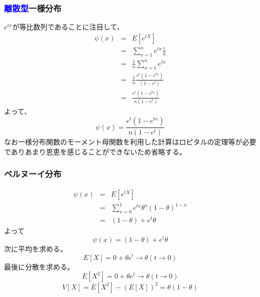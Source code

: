 \documentclass[a4paper,10pt]{jarticle}
\begin{document}
\subsubsection{\textcolor{blue}{離散型}一様分布}
$e^{tx}$が等比数列であることに注目して、
\begin{eqnarray*}
    \psi(x) &=& E[e^{tX}] \\
    &=& \sum_{x=1}^n e^{tx}\frac{1}{n}\\
    &=& \frac{1}{n}\sum_{x=1}^n e^{tx}\\
    &=& \frac{1}{n}\frac{e^t(1-e^{tn})}{(1-e^t)}\\
    &=& \frac{e^t(1-e^{tn})}{n(1-e^t)}
\end{eqnarray*}
よって、
\begin{equation}
    \psi(x) = \frac{e^t(1-e^{tn})}{n(1-e^t)}\tag{3,35}
\end{equation}
なお一様分布関数のモーメント母関数を利用した計算はロピタルの定理等が必要でありあまり恩恵を感じることができないため省略する。
\subsubsection{ベルヌーイ分布}
\begin{eqnarray*}
    \psi(x) &=& E[e^{tX}] \\
    &=& \sum_{x=0}^1 e^{tx}\theta^x (1-\theta)^{1-x}\\
    &=&(1-\theta)+e^t\theta
\end{eqnarray*}
よって
\begin{equation}
    \psi(x) = (1-\theta)+e^t\theta\tag{3,36}
\end{equation}
次に平均を求める。
\begin{equation}
    E[X] = 0+\theta e^t\rightarrow \theta(t\rightarrow 0)\tag{3,37}
\end{equation}
最後に分散を求める。
\begin{equation}
    E[X^2] = 0+\theta e^t\rightarrow \theta(t\rightarrow 0)\tag{3,38}
\end{equation}
\begin{equation}
    V[X] = E[X^2]-(E[X])^2 = \theta (1-\theta)\tag{3,39}
\end{equation}
\end{document}
